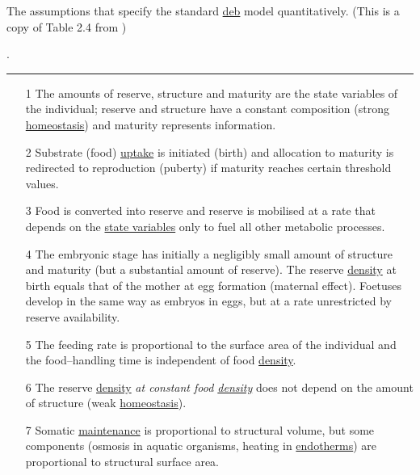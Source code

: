 \begin{table}[tb]\small
\caption[]{\label{tab:assumptions}\protect\small 
   The assumptions that specify the standard \hyperref[glos:DEB]{\sc deb}
  model quantitatively. (This is a copy of Table 2.4 from \citep{Kooy2010})}.

  \rule{16cm}{.1mm}
\begin{itemize}
  
\item[1] The amounts of reserve, structure and maturity are the state variables of the individual; 
  reserve and structure have a constant composition (strong \hyperref[glos:homeostasis]{homeostasis}) and maturity represents information.
  
\item[2] Substrate (food) \hyperref[glos:uptake]{uptake} is initiated (birth) and allocation to maturity is redirected to reproduction (puberty) if maturity reaches certain threshold values.
  
\item[3] Food is converted into reserve and reserve is mobilised at a rate that depends on the \hyperref[glos:state_variable]{state variables} only to fuel all other metabolic processes.
  
\item[4] The embryonic stage has initially a negligibly small amount of structure and maturity (but a substantial amount of reserve).
  The reserve \hyperref[glos:density]{density} at birth equals that of the mother at egg formation (maternal effect).
  Foetuses develop in the same way as embryos in eggs, but at a rate unrestricted by reserve availability.
  
\item[5] The feeding rate is proportional to the surface area of the individual and the food--handling time is independent of food \hyperref[glos:density]{density}.
 
\item[6] The reserve \hyperref[glos:density]{density} \emph{at constant food \hyperref[glos:density]{density}} does not depend on the amount of structure (weak \hyperref[glos:homeostasis]{homeostasis}).
  
\item[7] Somatic \hyperref[glos:maintenance]{maintenance} is proportional to structural volume, but some components (osmosis in aquatic organisms, heating in \hyperref[glos:endotherm]{endotherms}) are proportional to structural surface area.
  

\end{itemize}
\end{table}
